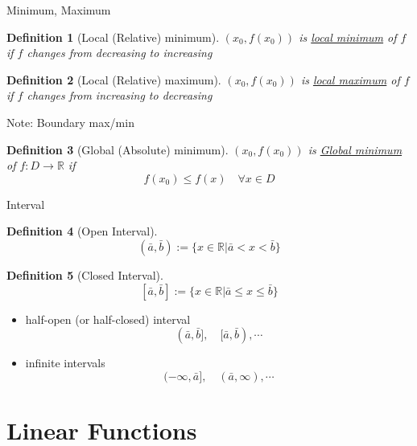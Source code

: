 \documentclass[final]{beamer}
\newtheorem{defn}{Definition}
\begin{document}
\begin{frame}[t]{Minimum, Maximum}
	\begin{defn}
		[Local (Relative) minimum]
		$(x_0,f(x_0))$ is \uline{local minimum} of $f$ if $f$ changes from decreasing to increasing
	\end{defn}
	
	\begin{defn}
		[Local (Relative) maximum]
		$(x_0,f(x_0))$ is \uline{local maximum} of $f$ if $f$ changes from increasing to decreasing
	\end{defn}
	
	Note: Boundary max/min
	
	\begin{defn}
		[Global (Absolute) minimum]
		$(x_0,f(x_0))$ is \uline{Global minimum} of $f:D\rightarrow \mathbb{R}$ if \[
			f(x_0)\le f(x) \quad \forall x \in D
		\]
	\end{defn}
\end{frame}

\begin{frame}[t]{Interval}
	\begin{defn}
		[Open Interval]
		\[
			(\bar a,\bar b):=\{x\in \mathbb{R}\vert \bar a < x < \bar b \}
		\]
	\end{defn}
	
	\begin{defn}
		[Closed Interval]
		\[
			[\bar a,\bar b]:=\{x\in \mathbb{R}\vert \bar a \le x \le  \bar b \}
		\]
	\end{defn}
	
	\begin{itemize}
		\item half-open (or half-closed) interval
		\[
			(\bar a, \bar b],\quad [\bar a, \bar b),\cdots
		\]
		\item infinite intervals
		\[
			(-\infty, \bar a],\quad (\bar a, \infty),\cdots
		\]
	\end{itemize}
\end{frame}

\section{Linear Functions} %
\label{sec:linear_functions}
\end{document}
